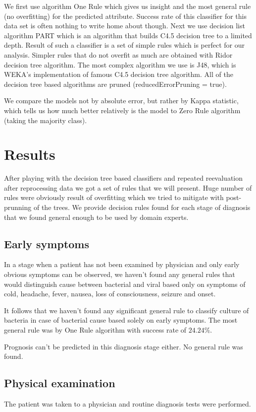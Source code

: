 \documentclass[11pt]{article}
\begin{document}
We first use algorithm One Rule which gives us insight and the most general
rule (no overfitting) for the predicted attribute. Success rate of this
classifier for this data set is often nothing to write home about though.
Next we use decision list algorithm PART\cite{Frank1998}\cite{weka_PART} which
is an algorithm that builds C4.5 decision tree to a limited depth. Result of
such a classifier is a set of simple rules which is perfect for our analysis.
Simpler rules that do not overfit as much are obtained with Ridor decision tree
algorithm. The most complex algorithm we use is J48, which is WEKA's implementation of
famous C4.5 decision tree algorithm. All of the decision tree based algorithms are pruned (reducedErrorPruning =
true).

We compare the models not by absolute error, but rather by Kappa statistic,
which tells us how much better relatively is the model to Zero Rule algorithm
(taking the majority class).



\section{Results}
After playing with the decision tree based classifiers and repeated
reevaluation after reprocessing data we got a set of rules that we will
present. Huge number of rules were obviously result of overfitting which we
tried to mitigate with post-prunning of the trees. We provide decision rules
found for each stage of diagnosis that we found general enough to be used by
domain experts.

\subsection{Early symptoms}
In a stage when a patient has not been examined by physician and only early
obvious symptoms can be observed, we haven't found any general rules that would
distinguish cause between bacterial and viral based only on symptoms of cold,
headache, fever, nausea, loss of consciousness, seizure and onset.

It follows that we haven't found any significant general rule to classify
culture of bacteria in case of bacterial cause based solely on early symptoms.
The most general rule was by One Rule algorithm with success rate of $24.24\%$.

Prognosis can't be predicted in this diagnosis stage either. No general rule
was found.

\subsection{Physical examination}
The patient was taken to a physician and routine diagnosis tests were
performed.
\end{document}
